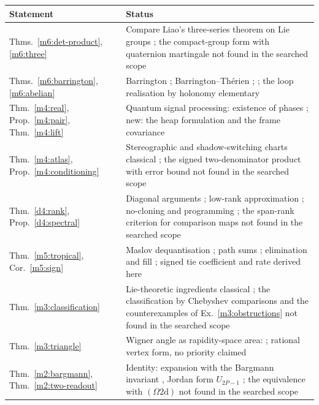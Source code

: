 \documentclass[11pt,reqno]{amsart}
\theoremstyle{definition}
\theoremstyle{remark}
\numberwithin{equation}{section}
\begin{document}
\begin{center}
\small
\begin{tabular}{@{}p{}p{}@{}}
\toprule
Statement & Status\\
\midrule
Thms.~\ref{m6:det-product}, \ref{m6:three} & Compare Liao's three-series theorem on Lie groups \cite{m6:Liao}; the compact-group form with quaternion martingale not found in the searched scope\\
Thms.~\ref{m6:barrington}, \ref{m6:abelian} & Barrington \cite{m6:Barrington}; Barrington--Th\'erien \cite{m6:BT}; \cite{m6:BST}; the loop realisation by holonomy elementary\\
Thm.~\ref{m4:real}, Prop.~\ref{m4:pair}, Thm.~\ref{m4:lift} & Quantum signal processing: existence of phases \cite{m4:LC,m4:GSLW,m4:Haah}; new: the heap formulation and the frame covariance\\
Thm.~\ref{m4:atlas}, Prop.~\ref{m4:conditioning} & Stereographic and shadow-switching charts classical \cite{SJ}; the signed two-denominator product with error bound not found in the searched scope\\
Thm.~\ref{d4:rank}, Prop.~\ref{d4:spectral} & Diagonal arguments \cite{d4-lawvere,d4-yanofsky}; low-rank approximation \cite{d4-ey}; no-cloning and programming \cite{d4-wootters,d4-dieks,d4-program}; the span-rank criterion for comparison maps not found in the searched scope\\
Thm.~\ref{m5:tropical}, Cor.~\ref{m5:sign} & Maslov dequantisation \cite{m5:Litvinov}; path sums \cite{m5:Giscard}; elimination and fill \cite{m5:Rose}; signed tie coefficient and rate derived here\\
Thm.~\ref{m3:classification} & Lie-theoretic ingredients classical \cite{Helgason}; the classification by Chebyshev comparisons and the counterexamples of Ex.~\ref{m3:obstructions} not found in the searched scope\\
Thm.~\ref{m3:triangle} & Wigner angle as rapidity-space area: \cite{m3Aravind,m3RhodesSemon,m3Ungar88,m3Ungar97}; rational vertex form, no priority claimed\\
Thm.~\ref{m2:bargmann}, Thm.~\ref{m2:two-readout} & Identity: expansion with the Bargmann invariant \cite{m2:Bargmann}, Jordan form $U_{2P-1}$ \cite{m2:FK}; the equivalence with $(\Omega2\mathrm d)$ not found in the searched scope\\
\bottomrule
\end{tabular}
\end{center}
\end{document}
